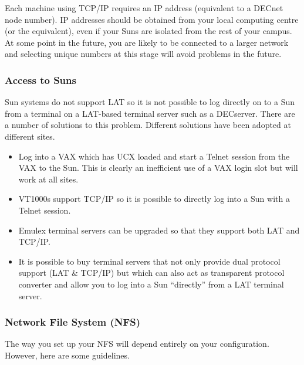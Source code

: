 Each machine using TCP/IP requires an IP address (equivalent to a DECnet node
number). IP addresses should be obtained from your local computing centre 
(or the equivalent), even if your Suns are isolated from the rest of your
campus. At some point in the future, you are likely to be connected to 
a larger network and
selecting unique numbers at this stage will avoid problems in the future.


\subsubsection{Access to Suns}

Sun systems do not support LAT so it is not possible to log directly on to 
a Sun from a terminal on a LAT-based terminal server such as a DECserver.
There are a number of solutions to this problem. Different solutions
have been adopted at different sites.
                                 
\begin{itemize}

\item Log into a VAX which has UCX loaded and start a Telnet session
from the VAX to the Sun. This is clearly an inefficient use of a VAX 
login slot but 
will work at all sites.

\item VT1000s support TCP/IP so it is possible to directly log into a Sun
with a Telnet session.

\item Emulex terminal servers can be upgraded so that they support both LAT
and TCP/IP.

\item It is possible to buy terminal servers that not only provide dual
protocol support (LAT \& TCP/IP) but which can also act as transparent 
protocol converter and allow you to log into a Sun ``directly'' from
a LAT terminal server. 

\end{itemize}

\subsubsection{Network File System (NFS)}

The way you set up your NFS will depend entirely on your configuration.
However, here are some guidelines.

